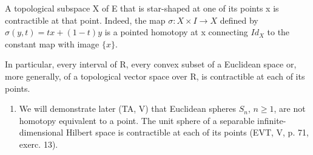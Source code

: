 A topological subspace X of E that is star-shaped at one of its points x is contractible at that point. Indeed, the map \(\sigma\colon X \times I \to X\) defined by \(\sigma(y,t) = tx + (1 - t)y\) is a pointed homotopy at x connecting \(Id_{X}\) to the constant map with image \(\{x\}\).

In particular, every interval of R, every convex subset of a Euclidean space or, more generally, of a topological vector space over R, is contractible at each of its points.

\begin{enumerate}
\def\labelenumi{\arabic{enumi})}
\setcounter{enumi}{4}
\tightlist
\item
  We will demonstrate later (TA, V) that Euclidean spheres \(S_n\), \(n\geqslant1\), are not homotopy equivalent to a point. The unit sphere of a separable infinite-dimensional Hilbert space is contractible at each of its points (EVT, V, p. 71, exerc. 13).
\end{enumerate}

